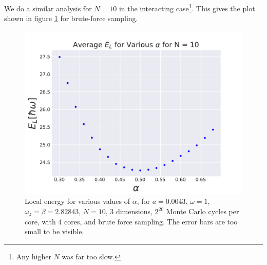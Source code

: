 \documentclass[a4paper, 10pt]{article}
\begin{document}
	\linebreak
	We do a similar analysis for $N=10$ in the interacting case\footnote{Any higher $N$ was far too slow.}. This gives the plot shown in figure \ref{fig:EL_alpha_N10_interacting} for brute-force sampling.
			\begin{figure}[ht!]
				\centering
				\includegraphics[scale=0.8]{../Results/Alpha_v_EL_Interacting_N10.pdf}
				\caption{Local energy for various values of $\alpha$, for $a=0.0043$, $\omega=1$, $\omega_z=\beta=2.82843$, $N=10$, 3 dimensions, $2^{20}$ Monte Carlo cycles per core, with 4 cores, and brute force sampling. The error bars are too small to be visible.}\label{fig:EL_alpha_N10_interacting}
			\end{figure}
\end{document}
